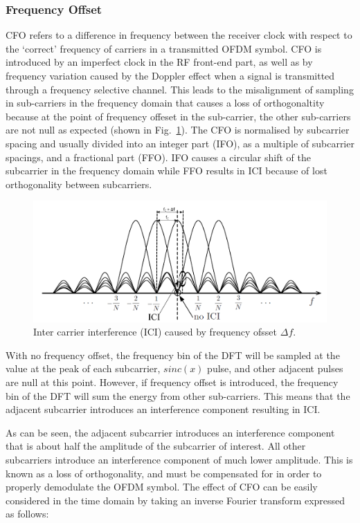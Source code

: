 \subsubsection{Frequency Offset}

CFO refers to a difference in frequency between the receiver clock with respect to the `correct' frequency of carriers in a transmitted OFDM symbol. 
CFO is introduced by an imperfect clock in the RF front-end part, as well as by frequency variation caused by the Doppler effect when a signal is transmitted through a frequency selective channel. 
This leads to the misalignment of sampling in sub-carriers in the frequency domain that causes a loss of orthogonaltity because at the point of frequency offeset in the sub-carrier, the other sub-carriers are not null as expected (shown in Fig.~\ref{fig:OFDM-subcarrier-freoff}).
The CFO is normalised by subcarrier spacing and usually divided into an integer part (IFO), as a multiple of subcarrier spacings, and a fractional part (FFO). 
IFO causes a circular shift of the subcarrier in the frequency domain while FFO results in ICI because of lost orthogonality between subcarriers.

\begin{figure}
	\centerline{\includegraphics [width=0.8\columnwidth] {Figures/OFDM-subcarrier-freoff.pdf} }
	\caption{Inter carrier interference (ICI) caused by frequency ofsset $\Delta f$.}
	\label{fig:OFDM-subcarrier-freoff}
\end{figure}

With no frequency offset, the frequency bin of the DFT will be sampled at the value at the peak of each subcarrier, $sinc(x)$ pulse, and other adjacent pulses are null at this point. 
However, if frequency offset is introduced, the frequency bin of the DFT will sum the energy from other sub-carriers. 
This means that the adjacent subcarrier introduces an interference component resulting in ICI. 

As can be seen, the adjacent subcarrier introduces an interference component that is about half the amplitude of the subcarrier of interest. 
All other subcarriers introduce an interference component of much lower amplitude. 
This is known as a loss of orthogonality, and must be compensated for in order to properly demodulate the OFDM symbol.
The effect of CFO can be easily considered in the time domain by taking an inverse Fourier transform expressed as follows:

